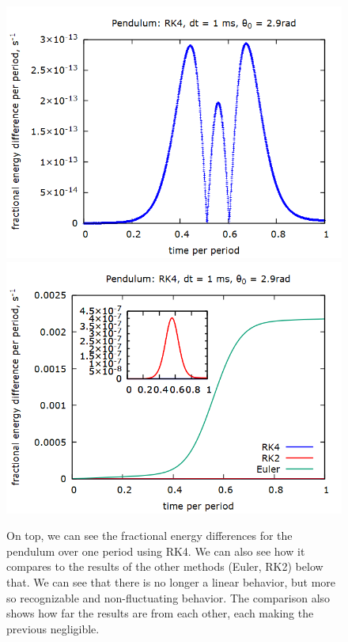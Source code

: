 \documentclass[aps,prl,twocolumn,superscriptaddress]{revtex4-1}
\begin{document}
\begin{figure}[htbp]
  	\begin{center}
 		\includegraphics[scale=0.3]{penddE.png}
 		\includegraphics[scale=0.3]{pende24.png}
  		\caption{On top, we can see the fractional energy differences for the pendulum over one period using RK4. We can also see how it compares to the results of the other methods (Euler, RK2) below that. We can see that there is no longer a linear behavior, but more so recognizable and non-fluctuating behavior. The comparison also shows how far the results are from each other, each making the previous negligible.}
  		\label{gr:penddE}
 	\end{center}
\end{figure}
\end{document}
